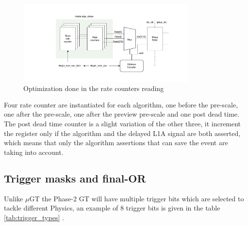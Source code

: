 \documentclass[../../main.tex]{subfiles}
\begin{document}
\begin{figure}[h]
    \centering
    \includegraphics[width=0.8\textwidth]{sections/06/Images/Rate_regs.pdf}
    \caption{Optimization done in the rate counters reading}
    \label{fig:Rate_cnt}
\end{figure}

Four rate counter are instantiated for each algorithm, one before the pre-scale, one after the pre-scale, one after the preview pre-scale and one post dead time. The post dead time counter is a slight variation of the other three, it increment the register only if the algorithm and the delayed L1A signal are both asserted,  which means that only the algorithm assertions that can save the event are taking into account.

\subsection{Trigger masks and final-OR}
\label{sec:Finor_trigger}

Unlike $\mu$GT the Phase-2 GT will have multiple trigger bits which are selected to tackle different Physics, an example of 8 trigger bits is given in the table \ref{tab:trigger_types} \cite{L1T-2up}.  
\end{document}
